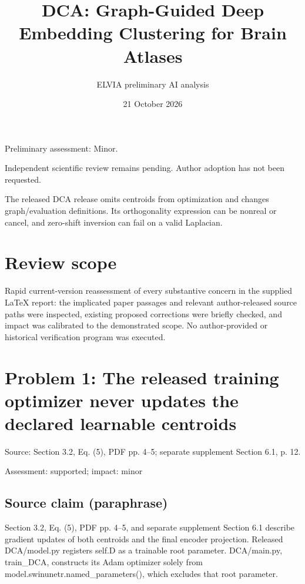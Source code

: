 \documentclass[11pt]{article}
\begin{document}
\title{DCA: Graph-Guided Deep Embedding Clustering for Brain Atlases}

\author{ELVIA preliminary AI analysis}\date{21 October 2026}\maketitle

Preliminary assessment: Minor.\par

Independent scientific review remains pending. Author adoption has not been requested.

The released DCA release omits centroids from optimization and changes graph/evaluation definitions. Its orthogonality expression can be nonreal or cancel, and zero-shift inversion can fail on a valid Laplacian.

\section*{Review scope}

Rapid current-version reassessment of every substantive concern in the supplied LaTeX report: the implicated paper passages and relevant author-released source paths were inspected, existing proposed corrections were briefly checked, and impact was calibrated to the demonstrated scope. No author-provided or historical verification program was executed.

\section*{Problem 1: The released training optimizer never updates the declared learnable centroids}

Source: Section 3.2, Eq. (5), PDF pp. 4–5; separate supplement Section 6.1, p. 12.

Assessment: supported; impact: minor

\subsection*{Source claim (paraphrase)}

Section 3.2, Eq. (5), PDF pp. 4–5, and separate supplement Section 6.1 describe gradient updates of both centroids and the final encoder projection. Released DCA/model.py registers self.D as a trainable root parameter. DCA/main.py, train\_DCA, constructs its Adam optimizer solely from model.swinunetr.named\_parameters(), which excludes that root parameter.
\end{document}
